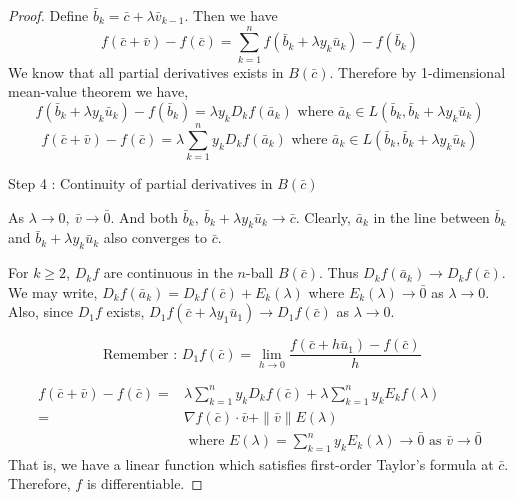 \begin{proof}
Define $\bar{b}_k = \bar{c}+\lambda{}\bar{v}_{k-1}$.
Then we have
\begin{equation}
	f(\bar{c}+\bar{v}) - f(\bar{c}) = \sum_{k = 1}^n f(\bar{b}_k + \lambda{}y_k\bar{u}_k)-f(\bar{b}_k)
\end{equation}
We know that all partial derivatives exists in $B(\bar{c})$.
Therefore by 1-dimensional mean-value theorem we have,
\[ f(\bar{b}_k+\lambda{}y_k\bar{u}_k) - f(\bar{b}_k) = \lambda{}y_kD_kf(\bar{a}_k) \text{ where } \bar{a}_k \in L(\bar{b}_k,\bar{b}_k+\lambda{}y_k\bar{u}_k) \]
\begin{equation}
	f(\bar{c}+\bar{v}) - f(\bar{c}) = \lambda{} \sum_{k = 1}^n y_kD_kf(\bar{a}_k) \text{ where } \bar{a}_k \in L(\bar{b}_k,\bar{b}_k+\lambda{}y_k\bar{u}_k)
\end{equation}
\begin{commentary}Step 4 : Continuity of partial derivatives in $B(\bar{c})$\end{commentary}

As $\lambda{} \to 0,\ \bar{v} \to \bar{0}$.
And both $\bar{b}_k,\ \bar{b}_k+\lambda{}y_k\bar{u}_k \to \bar{c}$.
Clearly, $\bar{a}_k$ in the line between $\bar{b}_k$ and $\bar{b}_k+\lambda{} y_k \bar{u}_k$ also converges to $\bar{c}$.

For $k \ge 2$, $D_kf$ are continuous in the $n$-ball $B(\bar{c})$.
Thus $D_kf(\bar{a}_k) \to D_kf(\bar{c})$.
We may write, $D_kf(\bar{a}_k) = D_kf(\bar{c}) + E_k(\lambda)$ where $E_k(\lambda) \to \bar{0}$ as $\lambda{} \to 0$.
Also, since $D_1 f$ exists, $D_1f(\bar{c}+\lambda{} y_1\bar{u}_1) \to D_1f(\bar{c})$ as $\lambda{} \to 0$.
\begin{commentary}
\[ \text{ Remember : } D_1 f(\bar{c}) = \lim_{h \to 0} \frac{f(\bar{c}+h\bar{u}_1) - f(\bar{c})}{h} \]
\end{commentary}
\begin{align*}
	f(\bar{c}+\bar{v}) - f(\bar{c}) = & \lambda{} \sum_{k = 1}^n y_kD_kf(\bar{c}) + \lambda{} \sum_{k = 1}^n y_kE_kf(\lambda{})\\
	= & \nabla f(\bar{c}) \cdot \bar{v} + \|\bar{v}\|E(\lambda) \\
	& \text{ where } E(\lambda{}) = \sum_{k = 1}^n y_k E_k(\lambda{}) \to \bar{0} \text{ as } \bar{v} \to \bar{0}
\end{align*}
That is, we have a linear function which satisfies first-order Taylor's formula at $\bar{c}$.
Therefore, $f$ is differentiable.
\end{proof}


